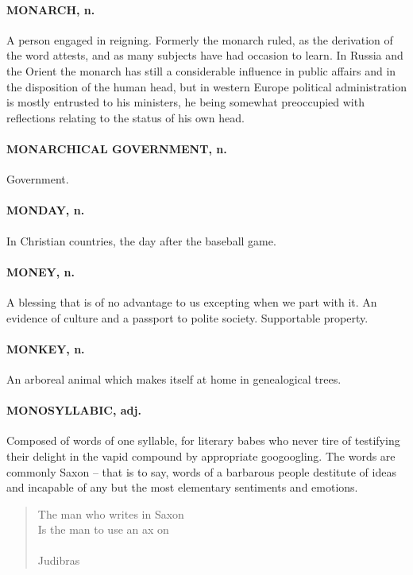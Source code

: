 \documentclass[11pt]{article}
\begin{document}
\paragraph{MONARCH, n.}  A person engaged in reigning.  Formerly the monarch
ruled, as the derivation of the word attests, and as many subjects
have had occasion to learn.  In Russia and the Orient the monarch has
still a considerable influence in public affairs and in the
disposition of the human head, but in western Europe political
administration is mostly entrusted to his ministers, he being
somewhat preoccupied with reflections relating to the status of his
own head.

\paragraph{MONARCHICAL GOVERNMENT, n.}  Government.

\paragraph{MONDAY, n.}  In Christian countries, the day after the baseball game.

\paragraph{MONEY, n.}  A blessing that is of no advantage to us excepting when we
part with it.  An evidence of culture and a passport to polite
society.  Supportable property.

\paragraph{MONKEY, n.}  An arboreal animal which makes itself at home in
genealogical trees.

\paragraph{MONOSYLLABIC, adj.}  Composed of words of one syllable, for literary
babes who never tire of testifying their delight in the vapid compound
by appropriate googoogling.  The words are commonly Saxon -- that is
to say, words of a barbarous people destitute of ideas and incapable
of any but the most elementary sentiments and emotions.

\begin{quote}   The man who writes in Saxon \\
  Is the man to use an ax on \\
 \\
Judibras \end{quote}
\end{document}
